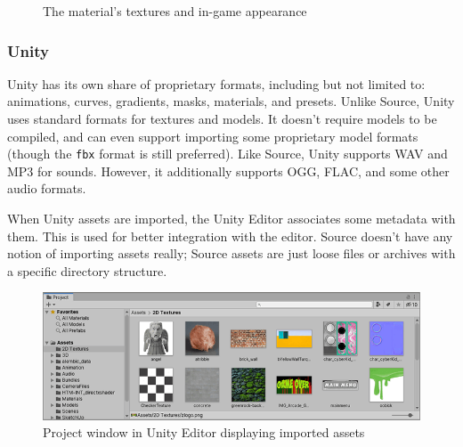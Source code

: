 \documentclass[a4paper, 12pt]{scrartcl}
\begin{document}
\begin{figure}[!htb]
  \centering
  \qquad
  \caption{The material's textures and in-game appearance}
  \label{fig:source_texture}
\end{figure}

\subsubsection{Unity}
Unity has its own share of proprietary formats, including but not limited to: animations, curves, gradients, masks, materials, and presets. Unlike Source, Unity uses standard formats for textures and models. It doesn't require models to be compiled, and can even support importing some proprietary model formats (though the \texttt{fbx} format is still preferred). Like Source, Unity supports WAV and MP3 for sounds. However, it additionally supports OGG, FLAC, and some other audio formats.

When Unity assets are imported, the Unity Editor associates some metadata with them. This is used for better integration with the editor. Source doesn't have any notion of importing assets really; Source assets are just loose files or archives with a specific directory structure.

\begin{figure}[!htb]
  \centering
  \includegraphics[width=0.75\linewidth]{images/unity_project_window.png}
  \caption{Project window in Unity Editor displaying imported assets}
  \label{fig:unity_project_window}
\end{figure}
\end{document}
